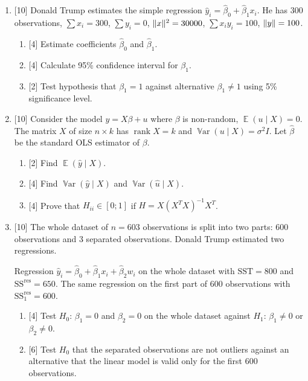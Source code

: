 \documentclass[12pt]{article}
\DeclareMathOperator{\Var}{\mathbb{V}ar}
\DeclareMathOperator{\rank}{rank}
\DeclareMathOperator{\E}{\mathbb{E}}
\newcommand{\SST}{\text{SST}}
\newcommand{\SSR}{\text{SS}^{\text{res}}}
\newcommand{\hb}{\hat{\beta}}
\DeclarePairedDelimiter{\norm}{\lVert}{\rVert}
\begin{document}
\begin{enumerate}
    \item {[10]} Donald Trump estimates the simple regression $\hat y_i = \hb_0 + \hb_1 x_i$.
    He has $300$ observations, $\sum x_i = 300$, $\sum y_i = 0$, $\norm{x}^2 = 30 000$, $\sum x_i y_i = 100$, $\norm{y} = 100$.

   \begin{enumerate}
        \item {[4]} Estimate coefficients $\hb_0$ and $\hb_1$.
        \item {[4]} Calculate 95\% confidence interval for $\beta_1$.
        \item {[2]} Test hypothesis that $\beta_1 = 1$ against alternative $\beta_1 \neq 1$ using 5\% significance level.
    \end{enumerate}
    

    \item {[10]} Consider the model $y = X\beta + u$ where $\beta$ is non-random, $\E(u \mid X ) = 0$. 
    The matrix $X$ of size $n\times k$ has $\rank X = k$ and $\Var(u \mid X) = \sigma^2 I$.
    Let $\hb$ be the standard OLS estimator of $\beta$.

    \begin{enumerate}
        \item {[2]} Find $\E(\hat y \mid X)$.
        \item {[4]} Find $\Var(\hat y \mid X)$ and $\Var(\hat u \mid X)$.
        \item {[4]} Prove that $H_{ii} \in [0;1]$ if $H = X(X^TX)^{-1}X^T$.
    \end{enumerate}


\item {[10]} The whole dataset of $n=603$ observations is split into two parts: $600$ observations and $3$ separated observations.
Donald Trump estimated two regressions.

Regression $\hat y_i = \hb_0 + \hb_1 x_i + \hb_2 w_i$ on the whole dataset with $\SST = 800$ and $\SSR = 650$.
The same regression on the first part of $600$ observations with $\SSR_1 = 600$.

\begin{enumerate}
    \item {[4]} Test $H_0$: $\beta_1 = 0$ and $\beta_2 = 0$ on the whole dataset against $H_1$: $\beta_1 \neq 0$ or $\beta_2 \neq 0$.
    \item {[6]} Test $H_0$ that the separated observations are not outliers against an alternative that the linear model is valid only for the first $600$ observations.  
\end{enumerate}


\end{enumerate}
\end{document}
